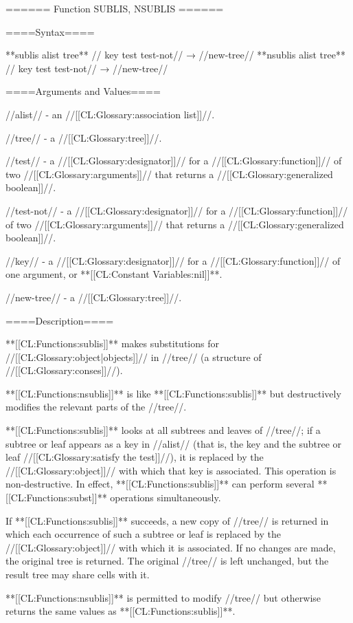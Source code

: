 ====== Function SUBLIS, NSUBLIS ======

====Syntax====

**sublis {alist tree** //\key} key test test-not// → //new-tree// **nsublis {alist tree** //\key} key test test-not// → //new-tree//

====Arguments and Values====

//alist// - an //[[CL:Glossary:association list]]//.

//tree// - a //[[CL:Glossary:tree]]//.

//test// - a //[[CL:Glossary:designator]]// for a //[[CL:Glossary:function]]// of two //[[CL:Glossary:arguments]]// that returns a //[[CL:Glossary:generalized boolean]]//.

//test-not// - a //[[CL:Glossary:designator]]// for a //[[CL:Glossary:function]]// of two //[[CL:Glossary:arguments]]// that returns a //[[CL:Glossary:generalized boolean]]//.

//key// - a //[[CL:Glossary:designator]]// for a //[[CL:Glossary:function]]// of one argument, or **[[CL:Constant Variables:nil]]**.

//new-tree// - a //[[CL:Glossary:tree]]//.

====Description====

**[[CL:Functions:sublis]]** makes substitutions for //[[CL:Glossary:object|objects]]// in //tree// (a structure of //[[CL:Glossary:conses]]//).

**[[CL:Functions:nsublis]]** is like **[[CL:Functions:sublis]]** but destructively modifies the relevant parts of the //tree//.

**[[CL:Functions:sublis]]** looks at all subtrees and leaves of //tree//; if a subtree or leaf appears as a key in //alist// (that is, the key and the subtree or leaf //[[CL:Glossary:satisfy the test]]//), it is replaced by the //[[CL:Glossary:object]]// with which that key is associated. This operation is non-destructive. In effect, **[[CL:Functions:sublis]]** can perform several **[[CL:Functions:subst]]** operations simultaneously.

If **[[CL:Functions:sublis]]** succeeds, a new copy of //tree// is returned in which each occurrence of such a subtree or leaf is replaced by the //[[CL:Glossary:object]]// with which it is associated. If no changes are made, the original tree is returned. The original //tree// is left unchanged, but the result tree may share cells with it.

**[[CL:Functions:nsublis]]** is permitted to modify //tree// but otherwise returns the same values as **[[CL:Functions:sublis]]**.

